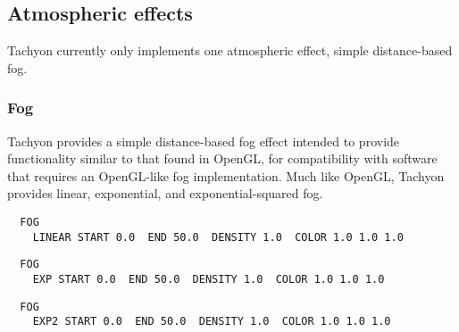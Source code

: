 
\subsection{Atmospheric effects}
Tachyon currently only implements one atmospheric effect, 
simple distance-based fog.

\subsubsection{Fog}
Tachyon provides a simple distance-based fog effect intended to provide
functionality similar to that found in OpenGL, for compatibility with
software that requires an OpenGL-like fog implementation.  Much like
OpenGL, Tachyon provides linear, exponential, and exponential-squared fog.

\begin{verbatim}
  FOG 
    LINEAR START 0.0  END 50.0  DENSITY 1.0  COLOR 1.0 1.0 1.0
\end{verbatim}

\begin{verbatim}
  FOG 
    EXP START 0.0  END 50.0  DENSITY 1.0  COLOR 1.0 1.0 1.0
\end{verbatim}

\begin{verbatim}
  FOG 
    EXP2 START 0.0  END 50.0  DENSITY 1.0  COLOR 1.0 1.0 1.0
\end{verbatim}



